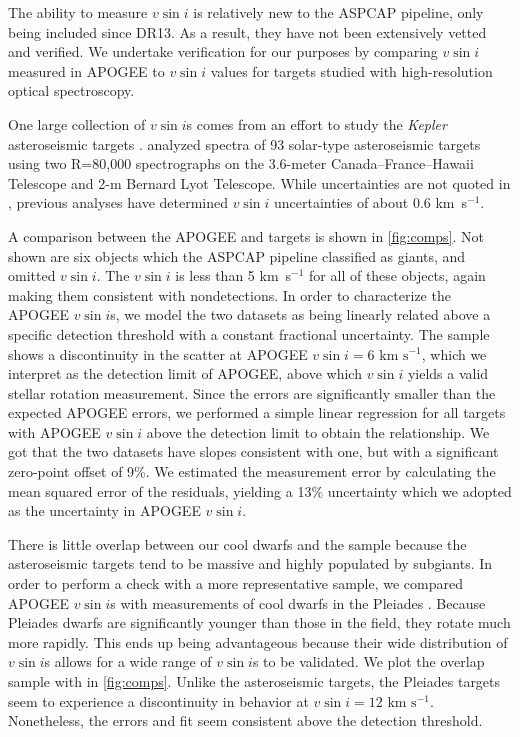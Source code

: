 \documentclass[manuscript]{aastex6}
\newcommand{\vsini}{\ensuremath{v \sin i}}
\newcommand{\Kepler}{\mbox{\textit{Kepler}}}
\newcommand{\kms}{\textrm{ km~s}\ensuremath{^{-1}}}
\begin{document}
The ability to measure \vsini{} is relatively new to the ASPCAP pipeline, only
being included since DR13. As a result, they have not been extensively vetted and 
verified. We undertake verification for our purposes by comparing \vsini{} 
measured in APOGEE to \vsini{} values for
targets studied with high-resolution optical spectroscopy. 

One large collection of \vsini{}s comes from an effort to study the
\Kepler{} asteroseismic targets \citep{Bruntt12}. \citet{Bruntt12} analyzed 
spectra of 93 solar-type asteroseismic targets using two R=80,000 spectrographs 
on the 3.6-meter Canada--France--Hawaii Telescope and 2-m Bernard Lyot
Telescope. While uncertainties are not quoted in \citet{Bruntt12},
previous analyses have determined \vsini{} uncertainties of about 0.6
\kms \citep{Bruntt10a,Bruntt10b}.

A comparison between the APOGEE and \citet{Bruntt12} targets is shown in
\cref{fig:comps}. Not shown are six
objects which the ASPCAP pipeline classified as giants, and omitted
\vsini{}. The \citet{Bruntt12} \vsini{} is less than 5
\kms{} for all of these objects, again making them consistent with 
nondetections.  In order to characterize the APOGEE \vsini{}s, we model the 
two datasets as being linearly related above a specific detection threshold 
with a constant fractional uncertainty. The sample shows a 
discontinuity in the scatter at APOGEE \(\vsini=6\kms\), which we 
interpret as the detection limit of APOGEE, above which \vsini{} yields a 
valid stellar rotation measurement. Since the \citet{Bruntt12} errors are
significantly smaller than the expected APOGEE errors, we performed a simple 
linear regression for all targets with APOGEE \vsini{} above the detection 
limit to obtain the relationship. We got that the two datasets have slopes
consistent with one, but with a significant zero-point offset of 9\%. We 
estimated the measurement error by calculating the mean squared error of the 
residuals, yielding a 13\% uncertainty which we adopted as the 
uncertainty in APOGEE \vsini{}.

There is little overlap between our cool dwarfs and the 
\citet{Bruntt12} sample because the asteroseismic targets tend to be massive and 
highly populated by subgiants. In order to perform a check with a more
representative sample, we compared APOGEE \vsini{}s with  
measurements of cool dwarfs in the Pleiades \citep{Stauffer87}. Because
Pleiades dwarfs are significantly younger than those in the field,
they rotate much more rapidly. This ends up being advantageous because their 
wide distribution of \vsini{}s allows for a wide range of \vsini{}s to be 
validated. We plot the overlap sample with \citet{Stauffer87} in 
\cref{fig:comps}.  Unlike the asteroseismic targets, the Pleiades targets 
seem to experience a discontinuity in behavior at \(\vsini = 12 \kms\). 
Nonetheless, the errors and fit seem consistent above the detection threshold.
\end{document}
